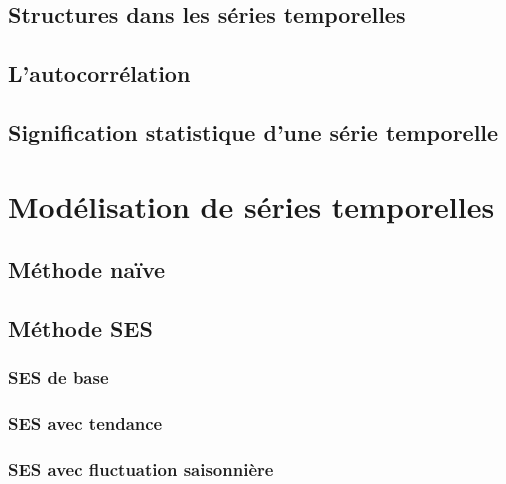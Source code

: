 \documentclass[]{book}
\begin{document}
\hypertarget{structures-dans-les-suxe9ries-temporelles}{%
\subsection{Structures dans les séries
temporelles}\label{structures-dans-les-suxe9ries-temporelles}}

\hypertarget{lautocorruxe9lation}{%
\subsection{L'autocorrélation}\label{lautocorruxe9lation}}

\hypertarget{signification-statistique-dune-suxe9rie-temporelle}{%
\subsection{Signification statistique d'une série
temporelle}\label{signification-statistique-dune-suxe9rie-temporelle}}

\hypertarget{moduxe9lisation-de-suxe9ries-temporelles}{%
\section{Modélisation de séries
temporelles}\label{moduxe9lisation-de-suxe9ries-temporelles}}

\hypertarget{muxe9thode-nauxefve}{%
\subsection{Méthode naïve}\label{muxe9thode-nauxefve}}

\hypertarget{muxe9thode-ses}{%
\subsection{Méthode SES}\label{muxe9thode-ses}}

\hypertarget{ses-de-base}{%
\subsubsection{SES de base}\label{ses-de-base}}

\hypertarget{ses-avec-tendance}{%
\subsubsection{SES avec tendance}\label{ses-avec-tendance}}

\hypertarget{ses-avec-fluctuation-saisonniuxe8re}{%
\subsubsection{SES avec fluctuation
saisonnière}\label{ses-avec-fluctuation-saisonniuxe8re}}
\end{document}
